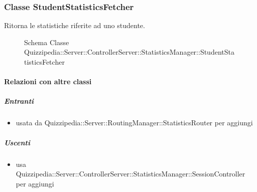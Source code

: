 \subsubsection{Classe StudentStatisticsFetcher}
Ritorna le statistiche riferite ad uno studente.
\begin{figure}[H]
\centering
\noindent{}
\caption[Schema Classe StudentStatisticsFetcher]{Schema Classe Quizzipedia::Server::ControllerServer::StatisticsManager::StudentStatisticsFetcher}
\end{figure}
\paragraph{Relazioni con altre classi}
\subparagraph{Entranti}
\begin{itemize}
\item usata da Quizzipedia::Server::RoutingManager::StatisticsRouter per aggiungi
\end{itemize}
\subparagraph{Uscenti}
\begin{itemize}
\item usa Quizzipedia::Server::ControllerServer::StatisticsManager::SessionController per aggiungi
\end{itemize}
